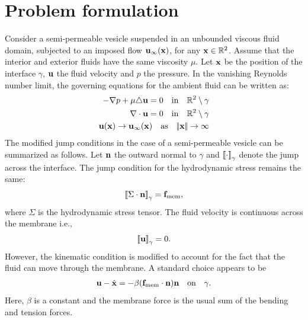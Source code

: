 \documentclass[twoside,twocolumn,9pt]{article}
\begin{document}
\section{Problem formulation} \label{sc:formulate}
Consider a semi-permeable vesicle suspended in an unbounded viscous
fluid domain, subjected to an imposed flow $\mathbf{u}_\infty(\mathbf{x})$, for any
$\mathbf{x} \in \mathbb{R}^2$.  Assume that the interior and exterior fluids have the same viscosity $\mu$. Let $\mathbf{x}$ be the position of the interface $\gamma$, $\mathbf{u}$ the fluid velocity and $p$ the pressure. In the vanishing Reynolds number limit, the governing equations for the ambient fluid can be written as: 
%
\begin{subequations}
\begin{align}
-\nabla p + \mu \triangle \mbu = 0 \quad\text{in}\quad
  \RR^2\setminus\gamma  &  \\
% 
\nabla \cdot \mbu = 0  \quad\text{in}\quad \RR^2\setminus\gamma &\\
%
\mbu(\mbx) \rightarrow \mbu_\infty(\mbx) \quad \text{as} \quad  \norm{\mbx} \rightarrow \infty & 
 \end{align} \label{eqn:governing}
\end{subequations}%
%
The modified jump conditions in the case of a semi-permeable vesicle can
be summarized as follows.  Let $\mathbf{n}$ the outward normal to $\gamma$ and
$\left[\!\left[ \cdot \right]\!\right]_\gamma$ denote the jump across the interface. The jump condition
for the hydrodynamic stress remains the same:
\begin{align} 
  \left[\!\left[ \Sigma\cdot\mathbf{n} \right]\!\right]_\gamma = \mathbf{f}_\text{mem}, 
\end{align}
where $\Sigma$ is the hydrodynamic stress tensor. The fluid velocity is
continuous across the membrane i.e.,
\begin{align}
  \left[\!\left[ \mathbf{u} \right]\!\right]_\gamma = 0. 
\end{align}
However, the kinematic condition is modified to account for the fact
that the fluid can move through the membrane. A standard choice appears
to be
%
\begin{align}
  \mathbf{u} - \dot{\mathbf{x}} = - \beta (\mathbf{f}_\text{mem} \cdot \mathbf{n}) \mathbf{n}
      \quad\text{on}\quad\gamma. 
\end{align}
%
Here, $\beta$ is a constant and the membrane force is the usual
sum of the bending and tension forces.
\end{document}
